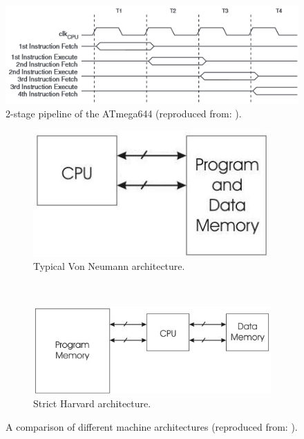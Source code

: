 \begin{figure}
\center
\includegraphics[scale=0.6]{img/pipeline.png}
\caption{\footnotesize 2-stage pipeline of the ATmega644 (reproduced from: \protect\citep{atmega_manual}).}
\label{fig:pipeline} 
\end{figure}
\begin{figure}
\begin{subfigure}{0.5\textwidth}
\center
\includegraphics[scale=0.5]{img/von_neuman_arch.jpg}
\caption{\footnotesize Typical Von Neumann architecture.}
\label{fig:VN_arch}
\end{subfigure} 
~
\begin{subfigure}{0.5\textwidth}
\center
\includegraphics[scale=0.5]{img/harvard_arch.jpeg}
\caption{\footnotesize Strict Harvard architecture.}
\label{fig:H_arch}
\end{subfigure}
\caption{\footnotesize A comparison of different machine architectures (reproduced from: \protect\citep{website:mcu_primer}).}
\label{fig:architectures}
\end{figure} 
